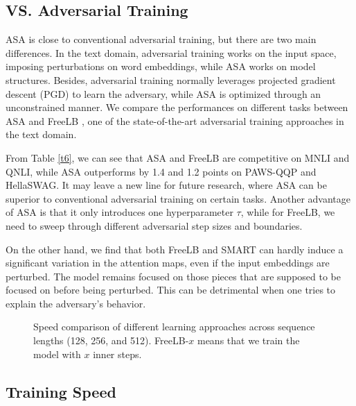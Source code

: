 \documentclass[letterpaper]{article} \usepackage{aaai23}  \usepackage{times}  \usepackage{helvet}  \usepackage{courier}  \usepackage[hyphens]{url}  \usepackage{graphicx} \urlstyle{rm} \def\UrlFont{\rm}  \usepackage{natbib}  \usepackage{caption} \frenchspacing  \setlength{\pdfpagewidth}{8.5in}  \setlength{\pdfpageheight}{11in}  \usepackage{algorithm}
\begin{document}
\subsection{VS. Adversarial Training}

ASA is close to conventional adversarial training, but there are two main differences. In the text domain, adversarial training works on the input space, imposing perturbations on word embeddings, while ASA works on model structures. Besides, adversarial training normally leverages projected gradient descent (PGD) \citep{DBLP:conf/iclr/MadryMSTV18} to learn the adversary, while ASA is optimized through an unconstrained manner. We compare the performances on different tasks between ASA and FreeLB \citep{DBLP:conf/iclr/ZhuCGSGL20}, one of the state-of-the-art adversarial training approaches in the text domain.

From Table \ref{t6}, we can see that ASA and FreeLB are competitive on MNLI and QNLI, while ASA outperforms by 1.4 and 1.2 points on PAWS-QQP and HellaSWAG. It may leave a new line for future research, where ASA can be superior to conventional adversarial training on certain tasks. Another advantage of ASA is that it only introduces one hyperparameter $ \tau $, while for FreeLB, we need to sweep through different adversarial step sizes and boundaries.

On the other hand, we find that both FreeLB and SMART can hardly induce a significant variation in the attention maps, even if the input embeddings are perturbed. The model remains focused on those pieces that are supposed to be focused on before being perturbed. This can be detrimental when one tries to explain the adversary's behavior.

\begin{figure}
\centering
{}
\caption{Speed comparison of different learning approaches across sequence lengths (128, 256, and 512). FreeLB-$x$ means that we train the model with $x$ inner steps.}
\label{f4}
\end{figure}

\subsection{Training Speed}
\end{document}
